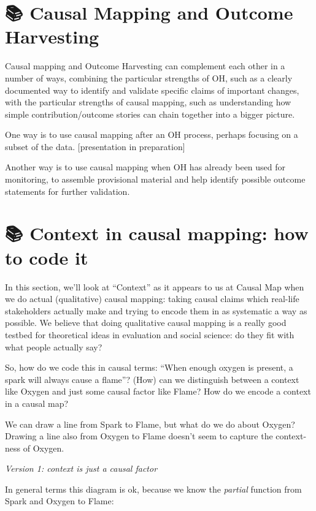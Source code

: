 \documentclass[
]{book}
\begin{document}
\hypertarget{causal-mapping-and-outcome-harvesting}{%
\chapter{📚 Causal Mapping and Outcome Harvesting}\label{causal-mapping-and-outcome-harvesting}}

Causal mapping and Outcome Harvesting can complement each other in a number of ways, combining the particular strengths of OH, such as a clearly documented way to identify and validate specific claims of important changes, with the particular strengths of causal mapping, such as understanding how simple contribution/outcome stories can chain together into a bigger picture.

One way is to use causal mapping after an OH process, perhaps focusing on a subset of the data. {[}presentation in preparation{]}

Another way is to use causal mapping when OH has already been used for monitoring, to assemble provisional material and help identify possible outcome statements for further validation.

\hypertarget{context-in-causal-mapping-how-to-code-it}{%
\chapter{📚 Context in causal mapping: how to code it}\label{context-in-causal-mapping-how-to-code-it}}

In this section, we'll look at ``Context'' as it appears to us at Causal Map when we do actual (qualitative) causal mapping: taking causal claims which real-life stakeholders actually make and trying to encode them in as systematic a way as possible. We believe that doing qualitative causal mapping is a really good testbed for theoretical ideas in evaluation and social science: do they fit with what people actually say?

So, how do we code this in causal terms: ``When enough oxygen is present, a spark will always cause a flame''? (How) can we distinguish between a context like Oxygen and just some causal factor like Flame? How do we encode a context in a causal map?

We can draw a line from Spark to Flame, but what do we do about Oxygen? Drawing a line also from Oxygen to Flame doesn't seem to capture the context-ness of Oxygen.

\emph{Version 1: context is just a causal factor}

In general terms this diagram is ok, because we know the \emph{partial} function from Spark and Oxygen to Flame:
\end{document}
